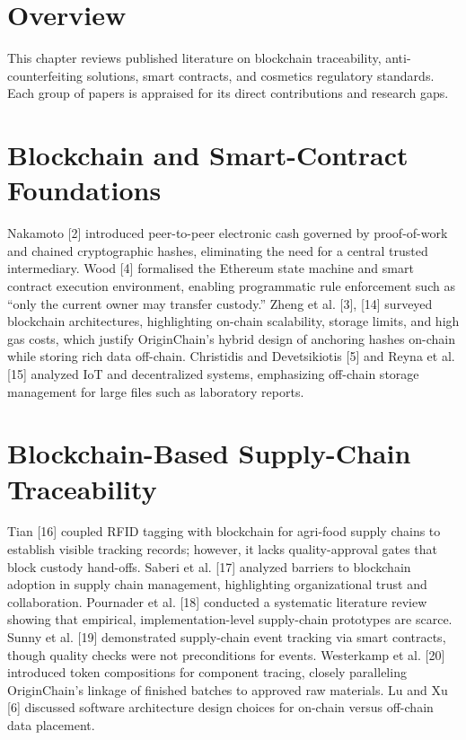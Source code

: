 \documentclass[12pt,a4paper]{report}
\begin{document}
\section{Overview}
This chapter reviews published literature on blockchain traceability, anti-counterfeiting solutions, smart contracts, and cosmetics regulatory standards. Each group of papers is appraised for its direct contributions and research gaps.

\section{Blockchain and Smart-Contract Foundations}
Nakamoto [2] introduced peer-to-peer electronic cash governed by proof-of-work and chained cryptographic hashes, eliminating the need for a central trusted intermediary. Wood [4] formalised the Ethereum state machine and smart contract execution environment, enabling programmatic rule enforcement such as ``only the current owner may transfer custody.'' Zheng et al. [3], [14] surveyed blockchain architectures, highlighting on-chain scalability, storage limits, and high gas costs, which justify OriginChain's hybrid design of anchoring hashes on-chain while storing rich data off-chain. Christidis and Devetsikiotis [5] and Reyna et al. [15] analyzed IoT and decentralized systems, emphasizing off-chain storage management for large files such as laboratory reports.

\section{Blockchain-Based Supply-Chain Traceability}
Tian [16] coupled RFID tagging with blockchain for agri-food supply chains to establish visible tracking records; however, it lacks quality-approval gates that block custody hand-offs. Saberi et al. [17] analyzed barriers to blockchain adoption in supply chain management, highlighting organizational trust and collaboration. Pournader et al. [18] conducted a systematic literature review showing that empirical, implementation-level supply-chain prototypes are scarce. Sunny et al. [19] demonstrated supply-chain event tracking via smart contracts, though quality checks were not preconditions for events. Westerkamp et al. [20] introduced token compositions for component tracing, closely paralleling OriginChain's linkage of finished batches to approved raw materials. Lu and Xu [6] discussed software architecture design choices for on-chain versus off-chain data placement.
\end{document}
